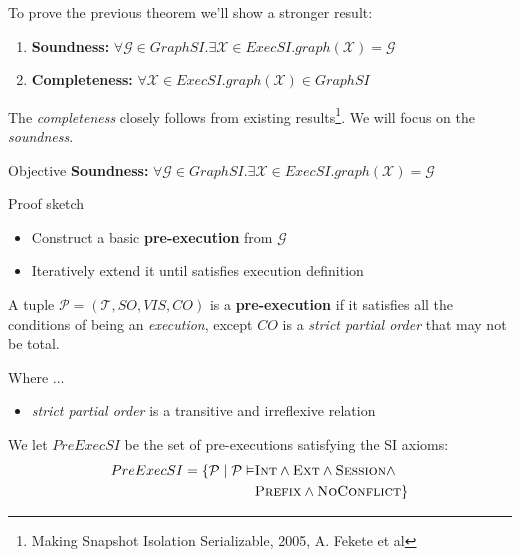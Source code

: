 \documentclass{beamer}
\begin{document}
\begin{frame}
	To prove the previous theorem we'll show a stronger result:
	\begin{theorem}
		\begin{enumerate}
			\item \textbf{Soundness:} $ \forall \mathcal{G} \in GraphSI. \exists \mathcal{X} \in ExecSI. graph(\mathcal{X}) = \mathcal{G} $ 
			\item \textbf{Completeness:} $ \forall \mathcal{X} \in ExecSI. graph(\mathcal{X}) \in GraphSI$
		\end{enumerate}
	\end{theorem}
	The \textit{completeness} closely follows from existing results\footnote{Making Snapshot Isolation Serializable, 2005, A. Fekete et al}. We will focus on the \textit{soundness}.
	
\end{frame}

\begin{frame}
	\begin{block}{Objective}
		\textbf{Soundness:} $ \forall \mathcal{G} \in GraphSI. \exists \mathcal{X} \in ExecSI. graph(\mathcal{X}) = \mathcal{G} $ 	
	\end{block}
	\begin{block}{Proof sketch}
		\begin{itemize}
			\item Construct a basic \textbf{pre-execution} from $\mathcal{G}$
			\item Iteratively extend it until satisfies execution definition
		\end{itemize}		
	\end{block}
\end{frame}

\begin{frame}
	\begin{definition}
		A tuple $\mathcal{P} = (\mathcal{T}, SO, VIS, CO) $ is a \textbf{pre-execution} if it satisfies all the conditions of being an \emph{execution}, except $CO$ is a \textit{strict partial order} that may not be total.
	\end{definition}
	Where ...
	\begin{itemize}
		\item \textit{strict partial order} is a transitive and irreflexive relation
	\end{itemize}
\end{frame}

\begin{frame}
	\begin{definition}
		We let $PreExecSI$ be the set of pre-executions satisfying the SI axioms:
		$$
		\begin{aligned}
			PreExecSI = \{ \mathcal{P} \mid \mathcal{P} \vDash & \textsc{Int} \wedge \textsc{Ext} \wedge \textsc{Session} \wedge \\
			& \textsc{Prefix} \wedge \textsc{NoConflict} \}
		\end{aligned}
		$$
	\end{definition}
\end{frame}
\end{document}
